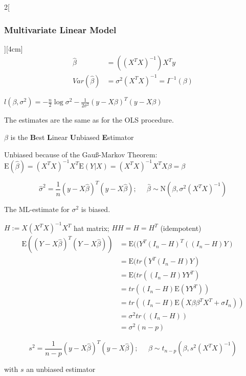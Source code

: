 \documentclass[8pt]{extarticle}
\begin{document}
\begin{multicols}{2}[\subsubsection{Multivariate Linear Model}][4cm]
\begin{align*}
\hat{\beta} &= \left((X^TX)^{-1}\right)X^Ty\\
Var(\hat{\beta}) &= \sigma^2(X^TX)^{-1} = I^{-1}(\beta)
\end{align*}

\begin{Proof}
$l(\beta,\sigma^2) = -\frac{n}{2}\log\sigma^2 -\frac{1}{2\sigma^2}(y-X\beta)^T(y-X\beta)$
\end{Proof}
The estimates are the same as for the OLS procedure.

\noindent $\beta$ is the \textbf{B}est \textbf{L}inear \textbf{U}nbiased \textbf{E}stimator

\begin{Proof}
Unbiased because of the Gauß-Markov Theorem:
$\mathrm{E}(\hat{\beta}) = (X^TX)^{-1}X^T\mathrm{E}(Y|X) = (X^TX)^{-1}X^TX\beta = \beta$
\end{Proof}
$$\hat{\sigma}^2 = \frac{1}{n}(y-X\hat{\beta})^T(y-X\hat{\beta});\;\;\;\;\; \hat{\beta} \sim \mathrm{N}(\beta,\sigma^2(X^TX)^{-1})$$

The ML-estimate for $\sigma^2$ is biased.

\begin{Proof}
$H{:=}X(X^TX)^{-1}X^T$ hat matrix; $HH{=}H{=}H^T$ (idempotent)
\begin{align*}
\mathrm{E}((Y{-}X\hat{\beta})^T(Y{-}X\hat{\beta})) &= \mathrm{E}((Y^T(I_n{-}H)^T((I_n{-}H)Y)\\
&= \mathrm{E}(tr(Y^T(I_n{-}H)Y)\\
&= \mathrm{E}(tr((I_n{-}H)YY^T)\\
&= tr((I_n{-}H)\mathrm{E}(YY^T))\\
&= tr((I_n{-}H)\mathrm{E}(X\beta\beta^TX^T + \sigma I_n))\\
&= \sigma^2tr((I_n{-}H))\\
&= \sigma^2 (n-p)
\end{align*}
\end{Proof}

$$s^2 = \frac{1}{n-p}(y-X\hat{\beta})^T(y-X\hat{\beta});\;\;\;\;\; \hat{\beta} \sim t_{n-p}(\beta,s^2(X^TX)^{-1})$$

with $s$ an unbiased estimator

\end{multicols}

\end{document}
